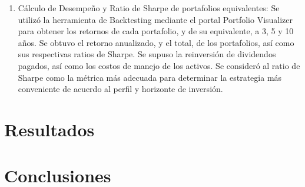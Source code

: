 \documentclass[a4paper,fleqn]{cas-sc}
\begin{document}
\begin{enumerate}[1.]
    \item Cálculo de Desempeño y Ratio de Sharpe de portafolios equivalentes: Se utilizó la herramienta de Backtesting mediante el portal Portfolio Visualizer para obtener los retornos de cada portafolio, y de su equivalente, a 3, 5 y 10 años. Se obtuvo el retorno anualizado, y el total, de los portafolios, así como sus respectivas ratios de Sharpe. Se supuso la reinversión de dividendos pagados, así como los costos de manejo de los activos. Se consideró al ratio de Sharpe como la métrica más adecuada para determinar la estrategia más conveniente de acuerdo al perfil y horizonte de inversión.
\end{enumerate}

\section{Resultados}

\section{Conclusiones}
\end{document}
